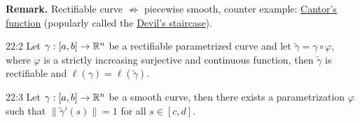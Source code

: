 \documentclass[../Analysis-3.tex]{subfiles}
\begin{document}
\textbf{Remark.} Rectifiable curve $\not\Rightarrow$ piecewise smooth, counter example: \href{https://en.wikipedia.org/wiki/Cantor_function}{Cantor's function} (popularly called the \href{https://mathweb.ucsd.edu/~bseward/140b_spring20/Devils-Staircase.pdf}{Devil's staircase}).

\begin{Thm}{}{22:2}
  Let $\gamma : [a,b] \to \mathbb{R}^n$ be a rectifiable parametrized curve and let $\tilde{\gamma} = \gamma \circ \varphi$, where $\varphi$ is a strictly increasing surjective and continuous function, then $\tilde{\gamma}$ is rectifiable and $\ell(\gamma) = \ell(\tilde{\gamma})$.
\end{Thm}

\begin{Thm}{}{22:3}
  Let $\gamma : [a,b] \to \mathbb{R}^n$ be a smooth curve, then there exists a parametrization $\varphi$ such that $\| \tilde{\gamma}'(s) \| = 1$ for all $s \in [c,d]$.
\end{Thm}
\end{document}
